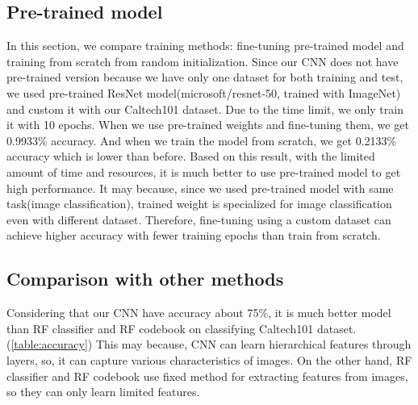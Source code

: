 \subsection{Pre-trained model}
In this section, we compare training methods: fine-tuning pre-trained model and training from scratch from random initialization. Since our CNN does not have pre-trained version because we have only one dataset for both training and test, we used pre-trained ResNet model(microsoft/resnet-50, trained with ImageNet) and custom it with our Caltech101 dataset. Due to the time limit, we only train it with 10 epochs. When we use pre-trained weights and fine-tuning them, we get 0.9933\% accuracy. And when we train the model from scratch, we get 0.2133\% accuracy which is lower than before. Based on this result, with the limited amount of time and resources, it is much better to use pre-trained model to get high performance. It may because, since we used pre-trained model with same task(image classification), trained weight is specialized for image classification even with different dataset. Therefore, fine-tuning using a custom dataset can achieve higher accuracy with fewer training epochs than train from scratch.

\subsection{Comparison with other methods}
Considering that our CNN have accuracy about 75\%, it is much better model than RF classifier and RF codebook on classifying Caltech101 dataset. (\cref{table:accuracy}) This may because, CNN can learn hierarchical features through layers, so, it can capture various characteristics of images. On the other hand, RF classifier and RF codebook use fixed method for extracting features from images, so they can only learn limited features.

